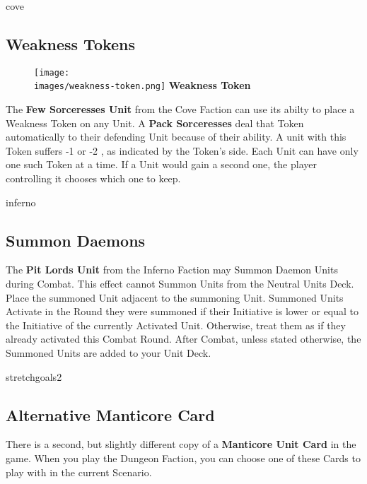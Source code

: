 \begin{multicols*}{2}
\vspace*{1em}
\begin{expansion}{cove}
	\subsection*{Weakness Tokens}
  \setlength\intextsep{0pt}
  \setlength\columnsep{1em}
  \begin{wrapfigure}{r}{0.2\linewidth}
		\texttt{[image: \\images/weakness-token.png]}
        \centering\textbf{\scriptsize\color{darkcandyapplered}Weakness \mbox{Token}\\}
	\end{wrapfigure}
  The \textbf{Few Sorceresses Unit} from the Cove Faction can use its  abilty to place a Weakness Token on any Unit.
  A \textbf{Pack Sorceresses} deal that Token automatically to their defending Unit because of their  ability.
  A unit with this Token suffers -1  or -2 , as indicated by the Token's side.
  Each Unit can have only one such Token at a time.
  If a Unit would gain a second one, the player controlling it chooses which one to keep.
\end{expansion}

\begin{expansion}{inferno}
	\subsection*{Summon Daemons}
	The \textbf{Pit Lords Unit} from the Inferno Faction may Summon Daemon Units during Combat.
	This effect cannot Summon Units from the Neutral Units Deck.
	Place the summoned Unit adjacent to the summoning Unit.
	Summoned Units Activate in the Round they were summoned if their Initiative is lower or equal to the Initiative of the currently Activated Unit.
	Otherwise, treat them as if they already activated this Combat Round.
	After Combat, unless stated otherwise, the Summoned Units are added to your Unit Deck.
\end{expansion}

\vspace*{1em}
\begin{expansion}{stretchgoals2}
	\subsection*{Alternative Manticore Card}
    There is a second, but slightly different copy of a \textbf{Manticore Unit Card} in the game. When you play the Dungeon Faction, you can choose one of these Cards to play with in the current Scenario.
\end{expansion}


\end{multicols*}
